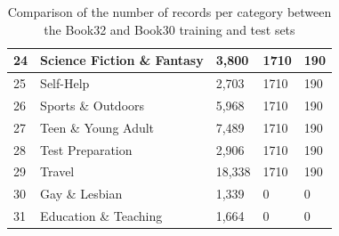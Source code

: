 \documentclass[12pt]{article}
\numberwithin{equation}{section}
\numberwithin{figure}{section}
\begin{document}
\begin{table}[]
\begin{tabular}{|l|l|l|l|l|}
	24             & Science Fiction \& Fantasy    & 3,800                                                          & 1710                                                                            & 190                                                                         \\ \hline
	25             & Self-Help                     & 2,703                                                          & 1710                                                                            & 190                                                                         \\ \hline
	26             & Sports \& Outdoors            & 5,968                                                          & 1710                                                                            & 190                                                                         \\ \hline
	27             & Teen \& Young Adult           & 7,489                                                          & 1710                                                                            & 190                                                                         \\ \hline
	28             & Test Preparation              & 2,906                                                          & 1710                                                                            & 190                                                                         \\ \hline
	29             & Travel                        & 18,338                                                         & 1710                                                                            & 190                                                                         \\ \hline
	30             & Gay \& Lesbian                & 1,339                                                          & 0                                                                               & 0                                                                           \\ \hline
	31             & Education \& Teaching         & 1,664                                                          & 0                                                                               & 0                                                                           \\ \hline
	\end{tabular}
	\caption{Comparison of the number of records per category between the Book32 and Book30 training and test sets}
	\label{tab:book_data_comparison}
	\end{table}
\end{document}
